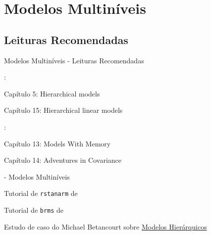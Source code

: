 \section{Modelos Multiníveis}

\subsection{Leituras Recomendadas}
\begin{frame}{Modelos Multiníveis - Leituras Recomendadas}
    \begin{vfilleditems}
        \item \textcite{gelman2013bayesian}:
        \begin{vfilleditems}
            \item Capítulo 5: Hierarchical models
            \item Capítulo 15: Hierarchical linear models
        \end{vfilleditems}
        \item \textcite{mcelreath2020statistical}:
        \begin{vfilleditems}
            \item Capítulo 13: Models With Memory
            \item Capítulo 14: Adventures in Covariance
        \end{vfilleditems}
        \item \textcite{storopoli2021estatisticabayesianaR} - Modelos Multiníveis
        \item Tutorial de \texttt{rstanarm} de \textcite{muth2018user}
        \item Tutorial de \texttt{brms} de \textcite{burknerAdvancedBayesianMultilevel2018}
        \item \textcite{gelmanDataAnalysisUsing2007}
        \item Estudo de caso do Michael Betancourt sobre \href{https://betanalpha.github.io/assets/case_studies/hierarchical_modeling.html}{Modelos Hierárquicos}
        \item \textcite{kruschke2015bayesian}
    \end{vfilleditems}
\end{frame}

